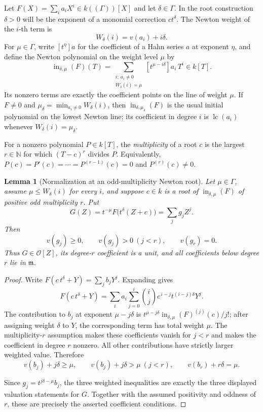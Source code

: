 \documentclass[11pt]{article}
\newcommand{\Val}{v}
\newcommand{\lc}{\operatorname{lc}}
\newcommand{\Init}{\operatorname{in}}
\newcommand{\Ocal}{\mathcal O}
\theoremstyle{proofnote}
\newtheorem{lemma}[theorem]{Lemma}
\begin{document}
Let \(F(X)=\sum_i a_iX^i\in k((\Gamma))[X]\) and let
\(\delta\in\Gamma\).  In the root construction \(\delta>0\) will be the
exponent of a monomial correction \(ct^\delta\).  The Newton weight of the
\(i\)-th term is
\[
  W_\delta(i)=\Val(a_i)+i\delta.
\]
For \(\mu\in\Gamma\), write \([t^\eta]a\) for the coefficient of a Hahn
series \(a\) at exponent \(\eta\), and define the Newton polynomial on the
weight level \(\mu\) by
\[
  \Init_{\delta,\mu}(F)(T)
  =
  \sum_{\substack{i:\ a_i\ne0\\ W_\delta(i)=\mu}}
    [t^{\mu-i\delta}]a_i\,T^i
  \in k[T].
\]
Its nonzero terms are exactly the coefficient points on the line of weight
\(\mu\).  If \(F\ne0\) and
\(\mu_\delta=\min_{a_i\ne0}W_\delta(i)\), then
\(\Init_{\delta,\mu_\delta}(F)\) is the usual initial polynomial on the
lowest Newton line; its coefficient in degree \(i\) is \(\lc(a_i)\) whenever
\(W_\delta(i)=\mu_\delta\).

For a nonzero polynomial \(P\in k[T]\), the \emph{multiplicity} of a root
\(c\) is the largest \(r\in\mathbb N\) for which \((T-c)^r\) divides
\(P\).  Equivalently, \(P(c)=P'(c)=\cdots=P^{(r-1)}(c)=0\) and
\(P^{(r)}(c)\ne0\).

\begin{lemma}[Normalization at an odd-multiplicity Newton root]
\label{lem:newton-correction}
  Let \(\mu\in\Gamma\), assume \(\mu\le W_\delta(i)\) for every \(i\), and
  suppose \(c\in k\) is a root of \(\Init_{\delta,\mu}(F)\) of positive odd
  multiplicity \(r\).  Put
  \[
    G(Z)=t^{-\mu}F\bigl(t^\delta(Z+c)\bigr)=\sum_j g_jZ^j.
  \]
  Then
  \[
    \Val(g_j)\ge0,\qquad
    \Val(g_j)>0\ (j<r),\qquad
    \Val(g_r)=0.
  \]
  Thus \(G\in\Ocal[Z]\), its degree-\(r\) coefficient is a unit, and all
  coefficients below degree \(r\) lie in \(\mathfrak m\).
\end{lemma}
\begin{proof}
  Write \(F(c\,t^\delta+Y)=\sum_j b_jY^j\).  Expanding gives
  \[
    F(c\,t^\delta+Y)
    =\sum_i a_i\sum_{j=0}^i\binom ij
       c^{\,i-j}t^{(i-j)\delta}Y^j.
  \]
  The contribution to \(b_j\) at exponent \(\mu-j\delta\) is
  \(t^{\mu-j\delta}\Init_{\delta,\mu}(F)^{(j)}(c)/j!\); after assigning
  weight \(\delta\) to \(Y\), the corresponding term has total weight
  \(\mu\).  The multiplicity-\(r\)
  assumption makes these coefficients vanish for \(j<r\) and makes the
  coefficient in degree \(r\) nonzero.  All other contributions have
  strictly larger weighted value.  Therefore
  \[
    \Val(b_j)+j\delta\ge\mu,\qquad
    \Val(b_j)+j\delta>\mu\ (j<r),\qquad
    \Val(b_r)+r\delta=\mu.
  \]

  Since \(g_j=t^{j\delta-\mu}b_j\), the three weighted inequalities
  are exactly the three displayed valuation statements for \(G\).  Together
  with the assumed positivity and oddness of \(r\), these are precisely the
  asserted coefficient conditions.
\end{proof}
\end{document}
